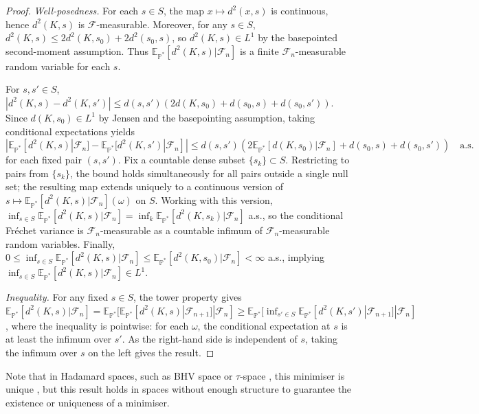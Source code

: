 \documentclass{article}
\begin{document}
\begin{proof}
\textit{Well-posedness.} For each $s \in S$, the map $x \mapsto d^2(x,s)$ is continuous, hence $d^2(K,s)$ is $\mathcal{F}$-measurable. Moreover, for any $s \in S$, $d^2(K,s) \leq 2d^2(K,s_0) + 2d^2(s_0,s)$, so $d^2(K,s) \in L^1$ by the basepointed second-moment assumption. Thus $\mathbb{E}_{\mathbb{P}^*}[d^2(K,s)|\mathcal{F}_n]$ is a finite $\mathcal{F}_n$-measurable random variable for each $s$.

For $s, s' \in S$, $|d^2(K,s) - d^2(K,s')| \leq d(s,s')(2d(K,s_0) + d(s_0,s) + d(s_0,s'))$. Since $d(K,s_0) \in L^1$ by Jensen and the basepointing assumption, taking conditional expectations yields $|\mathbb{E}_{\mathbb{P}^*}[d^2(K,s)|\mathcal{F}_n] - \mathbb{E}_{\mathbb{P}^*}[d^2(K,s')|\mathcal{F}_n]| \leq d(s,s')(2\mathbb{E}_{\mathbb{P}^*}[d(K,s_0)|\mathcal{F}_n] + d(s_0,s) + d(s_0,s')) \quad \text{a.s.}$ for each fixed pair $(s,s')$. Fix a countable dense subset $\{s_k\} \subset S$. Restricting to pairs from $\{s_k\}$, the bound holds simultaneously for all pairs outside a single null set; the resulting map extends uniquely to a continuous version of $s \mapsto \mathbb{E}_{\mathbb{P}^*}[d^2(K,s)|\mathcal{F}_n](\omega)$ on $S$. Working with this version, $\inf_{s \in S} \mathbb{E}_{\mathbb{P}^*}[d^2(K,s)|\mathcal{F}_n] = \inf_k \mathbb{E}_{\mathbb{P}^*}[d^2(K,s_k)|\mathcal{F}_n]$ a.s., so the conditional Fr\'{e}chet variance is $\mathcal{F}_n$-measurable as a countable infimum of $\mathcal{F}_n$-measurable random variables. Finally, $0 \leq \inf_{s \in S} \mathbb{E}_{\mathbb{P}^*}[d^2(K,s)|\mathcal{F}_n] \leq \mathbb{E}_{\mathbb{P}^*}[d^2(K,s_0)|\mathcal{F}_n] < \infty$ a.s., implying $\inf_{s \in S} \mathbb{E}_{\mathbb{P}^*}[d^2(K,s)|\mathcal{F}_n] \in L^1$.

\textit{Inequality.} For any fixed $s \in S$, the tower property gives $\mathbb{E}_{\mathbb{P}^*}[d^2(K,s)|\mathcal{F}_n] = \mathbb{E}_{\mathbb{P}^*}[\mathbb{E}_{\mathbb{P}^*}[d^2(K,s)|\mathcal{F}_{n+1}]|\mathcal{F}_n] \geq \mathbb{E}_{\mathbb{P}^*}[\inf_{s' \in S}\mathbb{E}_{\mathbb{P}^*}[d^2(K,s')|\mathcal{F}_{n+1}]|\mathcal{F}_n]$, where the inequality is pointwise: for each $\omega$, the conditional expectation at $s$ is at least the infimum over $s'$. As the right-hand side is independent of $s$, taking the infimum over $s$ on the left gives the result.
\end{proof}

Note that in Hadamard spaces, such as BHV space \citep{BHV2001} or $\tau$-space  \citep{tauspace2016}, this minimiser is unique \citep{Sturm2003ProbabilityMO}, but this result holds in spaces without enough structure to guarantee the existence or uniqueness of a minimiser.
\end{document}

